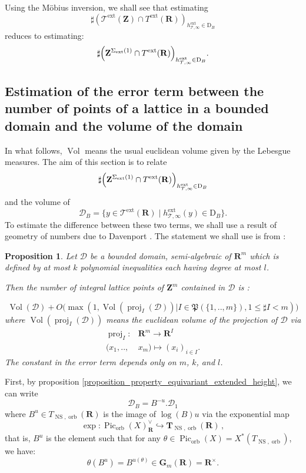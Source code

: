 \documentclass{proc-l}
\newcommand{\R}{\mathbf{R}}
\newcommand{\Z}{\mathbf{Z}}
\newcommand{\G}{\mathbf{G}}
\newcommand{\T}{\mathbf{T}}
\DeclareMathOperator{\Pic}{Pic}
\DeclareMathOperator{\proj}{proj}
\DeclareMathOperator{\Vol}{Vol}
\DeclareMathOperator{\NS}{NS}
\DeclareMathOperator{\orb}{orb}
\DeclareMathOperator{\ext}{ext}
\newcommand{\stackT}{\mathcal{T}}
\newtheorem{prop}[theorem]{Proposition}
\theoremstyle{definition}
\theoremstyle{remark}
\numberwithin{equation}{section}
\begin{document}
Using the Möbius inversion, we shall see that estimating $$\sharp \left( \stackT^{\ext}(\Z) \cap T^{\ext}(\R) \right)_{h^{\ext}_{\stackT,\infty} \in \mathrm{D}_B}$$ reduces to estimating:
$$\sharp \Bigl( \Z^{\Sigma_{\ext}(1)} \cap T^{\ext}(\R) \Bigr)_{h^{\ext}_{\stackT,\infty} \in \mathrm{D}_B} .$$




\subsection{Estimation of the error term between the number of points of a lattice in a bounded domain and the volume of the domain}

In what follows, $\Vol$ means the usual euclidean volume given by the Lebesgue measures. The aim of this section is to relate $$\sharp \Bigl( \Z^{\Sigma_{\ext}(1)} \cap T^{\ext}(\R) \Bigr)_{h^{\ext}_{\stackT,\infty} \in \mathrm{D}_{B}}$$ and the volume of $$\mathcal{D}_B = \{ y \in \stackT^{\ext}(\R) \mid h^{\ext}_{\stackT,\infty}(y) \in \mathrm{D}_{B}\}.$$ To estimate the difference between these two terms, we shall use a result of geometry of numbers due to Davenport \cite{davenport_geometry_numbers}. The statement we shall use is from \cite[proposition 24]{bhargava_counting_cubic_field}:



\begin{prop}\label{bhargava_geometrie_nombre}
Let $\mathcal{D}$ be a bounded domain,  semi-algebraic of $\R^m$ which is defined by at most $k$ polynomial inequalities each having degree at most $l$.


Then the number of integral lattice points of $\Z^m$ contained in $\mathcal{D}$ is :

$$\Vol(\mathcal{D}) + O\bigl( \max(1,\Vol(\proj_I(\mathcal{D})) | I \in \mathfrak{P}(\{1,..,m\}),  1 \leqslant \sharp I < m) \bigr)$$where $\Vol(\proj_I(\mathcal{D}))$ means the euclidean volume of the projection of $\mathcal{D}$ via 
\begin{align*}
    \proj_I : &\R^m \rightarrow \R^{ I} \\
    (x_1,..,&x_m) \longmapsto (x_i)_{i \in I} .
\end{align*}
The constant in the error term depends only on $m$, $k$, and $l$.

\end{prop}

First, by proposition \ref{proposition_property_equivariant_extended_height}, we can write $$\mathcal{D}_B = B^{-u} . \mathcal{D}_1$$where $B^u \in T_{\NS,\orb}(\R)$ is the image of $\log(B) u$ via the exponential map
$$    \exp : \Pic_{\orb}(X)^{\vee}_{\R} \hookrightarrow \T_{\NS,\orb}(\R) \, , $$that is, $B^u$ is the element such that for any $\theta \in \Pic_{\orb}(X) = X^*(T_{\NS,\orb})$, we have:
$$\theta(B^{u}) = B^{u(\theta)} \in \G_m(\R) = \R^{\times}  .$$
\end{document}
